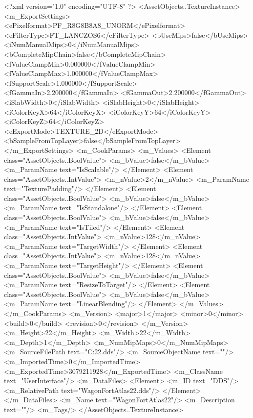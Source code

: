 <?xml version="1.0" encoding="UTF-8" ?>
<AssetObjects..TextureInstance>
	<m_ExportSettings>
		<ePixelformat>PF_R8G8B8A8_UNORM</ePixelformat>
		<eFilterType>FT_LANCZOS6</eFilterType>
		<bUseMips>false</bUseMips>
		<iNumManualMips>0</iNumManualMips>
		<bCompleteMipChain>false</bCompleteMipChain>
		<fValueClampMin>0.000000</fValueClampMin>
		<fValueClampMax>1.000000</fValueClampMax>
		<fSupportScale>1.000000</fSupportScale>
		<fGammaIn>2.200000</fGammaIn>
		<fGammaOut>2.200000</fGammaOut>
		<iSlabWidth>0</iSlabWidth>
		<iSlabHeight>0</iSlabHeight>
		<iColorKeyX>64</iColorKeyX>
		<iColorKeyY>64</iColorKeyY>
		<iColorKeyZ>64</iColorKeyZ>
		<eExportMode>TEXTURE_2D</eExportMode>
		<bSampleFromTopLayer>false</bSampleFromTopLayer>
	</m_ExportSettings>
	<m_CookParams>
		<m_Values>
			<Element class="AssetObjects..BoolValue">
				<m_bValue>false</m_bValue>
				<m_ParamName text="IsScalable"/>
			</Element>
			<Element class="AssetObjects..IntValue">
				<m_nValue>2</m_nValue>
				<m_ParamName text="TexturePadding"/>
			</Element>
			<Element class="AssetObjects..BoolValue">
				<m_bValue>false</m_bValue>
				<m_ParamName text="IsStandalone"/>
			</Element>
			<Element class="AssetObjects..BoolValue">
				<m_bValue>false</m_bValue>
				<m_ParamName text="IsTiled"/>
			</Element>
			<Element class="AssetObjects..IntValue">
				<m_nValue>128</m_nValue>
				<m_ParamName text="TargetWidth"/>
			</Element>
			<Element class="AssetObjects..IntValue">
				<m_nValue>128</m_nValue>
				<m_ParamName text="TargetHeight"/>
			</Element>
			<Element class="AssetObjects..BoolValue">
				<m_bValue>false</m_bValue>
				<m_ParamName text="ResizeToTarget"/>
			</Element>
			<Element class="AssetObjects..BoolValue">
				<m_bValue>false</m_bValue>
				<m_ParamName text="LinearBlending"/>
			</Element>
		</m_Values>
	</m_CookParams>
	<m_Version>
		<major>1</major>
		<minor>0</minor>
		<build>0</build>
		<revision>0</revision>
	</m_Version>
	<m_Height>22</m_Height>
	<m_Width>22</m_Width>
	<m_Depth>1</m_Depth>
	<m_NumMipMaps>0</m_NumMipMaps>
	<m_SourceFilePath text="C:\Users\aaron\Downloads\WagonFortAtlas22.dds"/>
	<m_SourceObjectName text=""/>
	<m_ImportedTime>0</m_ImportedTime>
	<m_ExportedTime>3079211928</m_ExportedTime>
	<m_ClassName text="UserInterface"/>
	<m_DataFiles>
		<Element>
			<m_ID text="DDS"/>
			<m_RelativePath text="WagonFortAtlas22.dds"/>
		</Element>
	</m_DataFiles>
	<m_Name text="WagonFortAtlas22"/>
	<m_Description text=""/>
	<m_Tags/>
</AssetObjects..TextureInstance>

